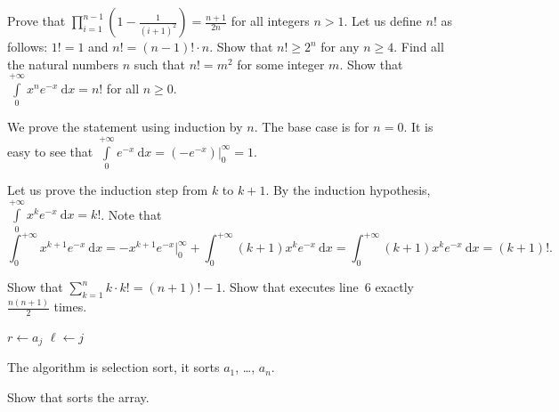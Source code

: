 \begin{chapterendexercises}
        Prove that
        $\prod_{i = 1}^{n - 1} \left(1 - \frac{1}{(i + 1)^2} \right) =
        \frac{n + 1}{2n}$ for all integers $n > 1$.
    \exercise Let us define $n!$ as follows: $1! = 1$ and
      $n! = (n - 1)! \cdot n$. Show that $n! \ge 2^n$ for any $n \ge 4$.
    \exercise[open] Find all the natural numbers $n$ such that $n! = m^2$ for
      some integer $m$.
    \exercise Show that
      $\int\limits_0^{+\infty} x^n e^{- x} ~ \mathrm{d}x = n!$
      for all $n \ge 0$.
      \begin{solution}
        We prove the statement using induction by $n$. The base case is for $n =
        0$. It is easy to see that $\int\limits_0^{+\infty} e^{-x} ~ \mathrm{d}x
        = (-e^{-x})\big\rvert_0^\infty = 1$.
 
        Let us prove the induction step from $k$ to $k + 1$. By the induction
        hypothesis, $\int\limits_0^{+\infty} x^k e^{- x} ~ \mathrm{d}x = k!$.
        Note that
        \[
          \int_0^{+\infty} x^{k + 1} e^{- x} ~ \mathrm{d}x =
          -x^{k + 1} e^{- x}\big\rvert_0^\infty +
            \int_0^{+\infty} (k + 1) x^k e^{- x} ~ \mathrm{d}x =
          \int_0^{+\infty} (k + 1) x^k e^{- x} ~ \mathrm{d}x = (k + 1)!.
        \]
      \end{solution}
    \exercise Show that $\sum_{k = 1}^n k \cdot k! = (n + 1)! - 1$.
    \exercise Show that  executes line~6 exactly
      $\frac{n (n + 1)}{2}$ times.
      \begin{algorithm}
        \begin{algorithmic}[1]
                  \State $r \gets a_j$
                  \State $\ell \gets j$
                \EndIf
              \EndFor
            \EndFor
          \EndFunction
        \end{algorithmic}
        \caption{The algorithm is selection sort, it sorts $a_1$, \dots, $a_n$.}
        \label{algorithm:selection-sort}
      \end{algorithm}
    \exercise Show that  sorts the array.
\end{chapterendexercises}
